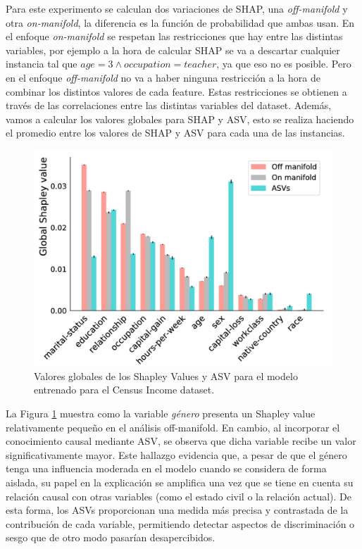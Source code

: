 Para este experimento se calculan dos variaciones de SHAP, una \emph{off-manifold} y otra \emph{on-manifold}, la diferencia es la función de probabilidad que ambas usan. En el enfoque \emph{on-manifold} se respetan las restricciones que hay entre las distintas variables, por ejemplo a la hora de calcular SHAP se va a descartar cualquier instancia tal que $age=3 \land occupation = teacher$, ya que eso no es posible. Pero en el enfoque \emph{off-manifold} no va a haber ninguna restricción a la hora de combinar los distintos valores de cada feature. Estas restricciones se obtienen a través de las correlaciones entre las distintas variables del dataset. Además, vamos a calcular los valores globales para SHAP y ASV, esto se realiza haciendo el promedio entre los valores de SHAP y ASV para cada una de las instancias. 

\begin{figure}
    \centering
    \includegraphics[width=0.5\linewidth]{img/asvPaperPlotExample.png}
    \caption{Valores globales de los Shapley Values y ASV para el modelo entrenado para el Census Income dataset.}
    \label{fig:asvPaperPlotExample}
\end{figure}

La Figura \ref{fig:asvPaperPlotExample} muestra como la variable \emph{género} presenta un Shapley value relativamente pequeño en el análisis off-manifold. En cambio, al incorporar el conocimiento causal mediante ASV, se observa que dicha variable recibe un valor significativamente mayor. Este hallazgo evidencia que, a pesar de que el género tenga una influencia moderada en el modelo cuando se considera de forma aislada, su papel en la explicación se amplifica una vez que se tiene en cuenta su relación causal con otras variables (como el estado civil o la relación actual). De esta forma, los ASVs proporcionan una medida más precisa y contrastada de la contribución de cada variable, permitiendo detectar aspectos de discriminación o sesgo que de otro modo pasarían desapercibidos.

